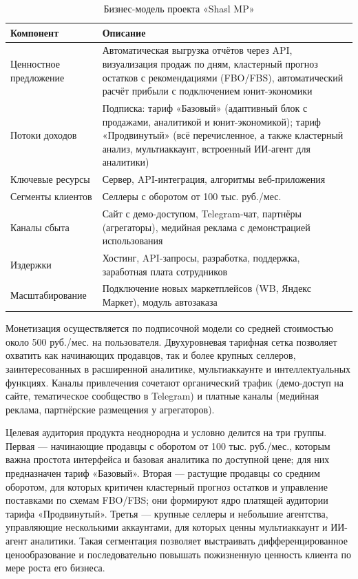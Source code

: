 \begin{table}[!htb]
\caption{Бизнес-модель проекта «Shasl MP»}
\label{tab:businessModel}
\begin{small}
\begin{center}
\begin{tabular}{|p{3.5cm}|p{12cm}|}
\hline
Компонент & Описание \\ \hline
Ценностное предложение & Автоматическая выгрузка отчётов через API, визуализация продаж по дням, кластерный прогноз остатков с рекомендациями (FBO/FBS), автоматический расчёт прибыли с подключением юнит-экономики \\ \hline
Потоки доходов & Подписка: тариф «Базовый» (адаптивный блок с продажами, аналитикой и юнит-экономикой); тариф «Продвинутый» (всё перечисленное, а также кластерный анализ, мультиаккаунт, встроенный ИИ-агент для аналитики) \\ \hline
Ключевые ресурсы & Сервер, API-интеграция, алгоритмы веб-приложения \\ \hline
Сегменты клиентов & Селлеры с оборотом от 100 тыс. руб./мес. \\ \hline
Каналы сбыта & Сайт с демо-доступом, Telegram-чат, партнёры (агрегаторы), медийная реклама с демонстрацией использования \\ \hline
Издержки & Хостинг, API-запросы, разработка, поддержка, заработная плата сотрудников \\ \hline
Масштабирование & Подключение новых маркетплейсов (WB, Яндекс Маркет), модуль автозаказа \\ \hline
\end{tabular}
\end{center}
\end{small}
\end{table}

Монетизация осуществляется по подписочной модели со средней стоимостью около 500 руб./мес. на пользователя. Двухуровневая тарифная сетка позволяет охватить как начинающих продавцов, так и более крупных селлеров, заинтересованных в расширенной аналитике, мультиаккаунте и интеллектуальных функциях. Каналы привлечения сочетают органический трафик (демо-доступ на сайте, тематическое сообщество в Telegram) и платные каналы (медийная реклама, партнёрские размещения у агрегаторов).

Целевая аудитория продукта неоднородна и условно делится на три группы. Первая --- начинающие продавцы с оборотом от 100 тыс. руб./мес., которым важна простота интерфейса и базовая аналитика по доступной цене; для них предназначен тариф «Базовый». Вторая --- растущие продавцы со средним оборотом, для которых критичен кластерный прогноз остатков и управление поставками по схемам FBO/FBS; они формируют ядро платящей аудитории тарифа «Продвинутый». Третья --- крупные селлеры и небольшие агентства, управляющие несколькими аккаунтами, для которых ценны мультиаккаунт и ИИ-агент аналитики. Такая сегментация позволяет выстраивать дифференцированное ценообразование и последовательно повышать пожизненную ценность клиента по мере роста его бизнеса.

